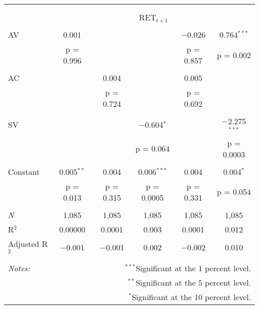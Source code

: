 
\begin{tabular}{@{\extracolsep{5pt}}lccccc} 
\\[-1.8ex]\hline 
\hline \\[-1.8ex] 
\\[-1.8ex] & \multicolumn{5}{c}{RET$_{t+1}$} \\ 
\hline \\[-1.8ex] 
 AV & 0.001 &  &  & $-$0.026 & 0.764$^{***}$ \\ 
  & p = 0.996 &  &  & p = 0.857 & p = 0.002 \\ 
  & & & & & \\ 
 AC &  & 0.004 &  & 0.005 &  \\ 
  &  & p = 0.724 &  & p = 0.692 &  \\ 
  & & & & & \\ 
 SV &  &  & $-$0.604$^{*}$ &  & $-$2.275$^{***}$ \\ 
  &  &  & p = 0.064 &  & p = 0.0003 \\ 
  & & & & & \\ 
 Constant & 0.005$^{**}$ & 0.004 & 0.006$^{***}$ & 0.004 & 0.004$^{*}$ \\ 
  & p = 0.013 & p = 0.315 & p = 0.0005 & p = 0.331 & p = 0.054 \\ 
  & & & & & \\ 
\textit{N} & 1,085 & 1,085 & 1,085 & 1,085 & 1,085 \\ 
R$^{2}$ & 0.00000 & 0.0001 & 0.003 & 0.0001 & 0.012 \\ 
Adjusted R$^{2}$ & $-$0.001 & $-$0.001 & 0.002 & $-$0.002 & 0.010 \\ 
\hline 
\hline \\[-1.8ex] 
\textit{Notes:} & \multicolumn{5}{r}{$^{***}$Significant at the 1 percent level.} \\ 
 & \multicolumn{5}{r}{$^{**}$Significant at the 5 percent level.} \\ 
 & \multicolumn{5}{r}{$^{*}$Significant at the 10 percent level.} \\ 
\end{tabular} 
